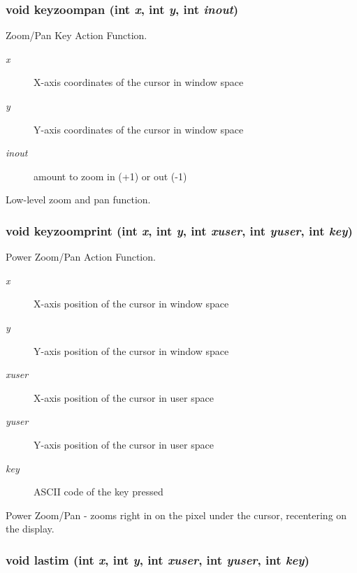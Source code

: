 \subsubsection{\setlength{\rightskip}{0pt plus 5cm}void keyzoompan (int {\em x}, int {\em y}, int {\em inout})}\label{xtvutils_8c_a209}


Zoom/Pan Key Action Function. 

\begin{Desc}
\item[Parameters:]
\begin{description}
\item[{\em x}]X-axis coordinates of the cursor in window space \item[{\em y}]Y-axis coordinates of the cursor in window space \item[{\em inout}]amount to zoom in (+1) or out (-1)\end{description}
\end{Desc}
Low-level zoom and pan function. 
\subsubsection{\setlength{\rightskip}{0pt plus 5cm}void keyzoomprint (int {\em x}, int {\em y}, int {\em xuser}, int {\em yuser}, int {\em key})}\label{xtvutils_8c_a214}


Power Zoom/Pan Action Function. 

\begin{Desc}
\item[Parameters:]
\begin{description}
\item[{\em x}]X-axis position of the cursor in window space \item[{\em y}]Y-axis position of the cursor in window space \item[{\em xuser}]X-axis position of the cursor in user space \item[{\em yuser}]Y-axis position of the cursor in user space \item[{\em key}]ASCII code of the key pressed\end{description}
\end{Desc}
Power Zoom/Pan - zooms right in on the pixel under the cursor, recentering on the display. 
\subsubsection{\setlength{\rightskip}{0pt plus 5cm}void lastim (int {\em x}, int {\em y}, int {\em xuser}, int {\em yuser}, int {\em key})}\label{xtvutils_8c_a218}


